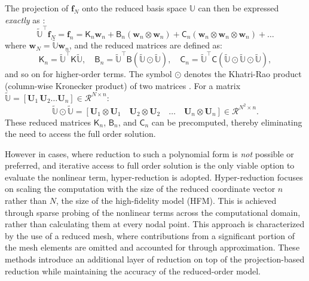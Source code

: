\documentclass[11pt]{article}
\renewcommand{\vec}[1]{\mathbf{#1}}
\newcommand{\mat}[1]{\mathsf{#1}}
\begin{document}
The projection of $\mathbf{f}_N$ onto the reduced basis space $\mathbb{U}$ can then be expressed \textit{exactly} as \cite{ghattas2021learning}:
\begin{equation}
\widetilde{\mathbb{U}}^\top\vec{f}_N = \mathbf{f}_n =  \mat{K}_n \mathbf{w}_n + \mat{B}_n (\mathbf{w}_n \otimes \mathbf{w}_n) + \mat{C}_n (\mathbf{w}_n \otimes \mathbf{w}_n \otimes \mathbf{w}_n) + \dots
\label{eq:red_poly_non}
\end{equation}
where $\vec{w}_N=\widetilde{\mathbb{U}}\vec{w}_n$, and the reduced matrices are defined as:
\begin{equation}
\mat{K}_n = \widetilde{\mathbb{U}}^\top \mat{K} \widetilde{\mathbb{U}}, \quad \mat{B}_n = \widetilde{\mathbb{U}}^\top \mat{B} (\widetilde{\mathbb{U}} \odot \widetilde{\mathbb{U}}), \quad \mat{C}_n = \widetilde{\mathbb{U}}^\top \mat{C} (\widetilde{\mathbb{U}} \odot \widetilde{\mathbb{U}} \odot \widetilde{\mathbb{U}}),
\label{eq:red_matrices}
\end{equation}
and so on for higher-order terms.
The symbol \(\odot\) denotes the Khatri-Rao product (column-wise Kronecker product) of two matrices \cite{kolda2009tensor}.
For a matrix $\widetilde{\mathbb{U}} = [\vec{U}_1\, \vec{U}_2 \ldots \vec{U}_n] \in \mathcal{R}^{N \times n}$:
\begin{equation}
\widetilde{\mathbb{U}} \odot \widetilde{\mathbb{U}} = [\mathbf{U}_1 \otimes \mathbf{U}_1 \quad \mathbf{U}_2 \otimes \mathbf{U}_2 \quad \ldots \quad \mathbf{U}_n \otimes \mathbf{U}_n] \in \mathcal{R}^{N^2 \times n}.
\end{equation}
These reduced matrices $\mat{K}_n$, $\mat{B}_n$, and $\mat{C}_n$ can be precomputed, thereby eliminating the need to access the full order solution.


However in cases, where reduction to such a polynomial form is \textit{not} possible or preferred, and iterative access to full order solution is the only viable option to evaluate the nonlinear term, hyper-reduction is adopted.
Hyper-reduction focuses on scaling the computation with the size of the reduced coordinate vector $n$ rather than $N$, the size of the high-fidelity model (HFM).
This is achieved through sparse probing of the nonlinear terms across the computational domain, rather than calculating them at every nodal point. 
This approach is characterized by the use of a reduced mesh, where contributions from a significant portion of the mesh elements are omitted and accounted for through approximation. 
These methods introduce an additional layer of reduction on top of the projection-based reduction while maintaining the accuracy of the reduced-order model.
\end{document}
